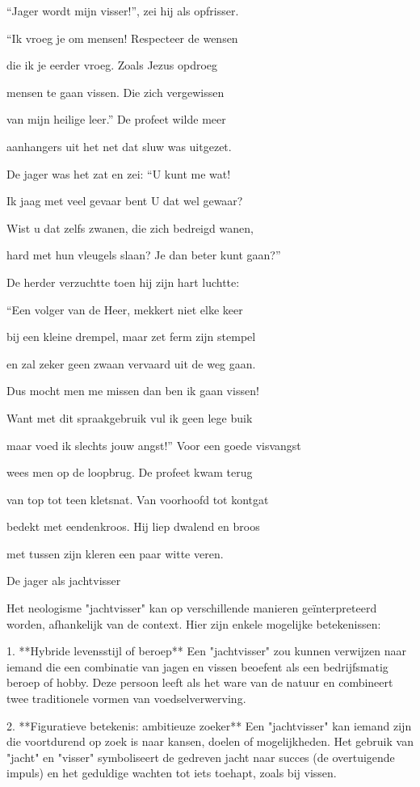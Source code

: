 “Jager wordt mijn visser!”,
zei hij als opfrisser.

“Ik vroeg je om mensen!
Respecteer de wensen

die ik je eerder vroeg.
Zoals Jezus opdroeg

mensen te gaan vissen.
Die zich vergewissen

van mijn heilige leer.”
De profeet wilde meer

aanhangers uit het net
dat sluw was uitgezet.

De jager was het zat
en zei: “U kunt me wat!

Ik jaag met veel gevaar
bent U dat wel gewaar?

Wist u dat zelfs zwanen,
die zich bedreigd wanen,

hard met hun vleugels slaan?
Je dan beter kunt gaan?”

De herder verzuchtte
toen hij zijn hart luchtte:

“Een volger van de Heer,
mekkert niet elke keer

bij een kleine drempel,
maar zet ferm zijn stempel

en zal zeker geen zwaan
vervaard uit de weg gaan.

Dus mocht men me missen
dan ben ik gaan vissen!

Want met dit spraakgebruik
vul ik geen lege buik

maar voed ik slechts jouw angst!”
Voor een goede visvangst

wees men op de loopbrug.
De profeet kwam terug

van top tot teen kletsnat.
Van voorhoofd tot kontgat

bedekt met eendenkroos.
Hij liep dwalend en broos

met tussen zijn kleren
een paar witte veren.

De jager als jachtvisser

Het neologisme "jachtvisser" kan op verschillende manieren geïnterpreteerd worden, afhankelijk van de context. Hier zijn enkele mogelijke betekenissen:

1. **Hybride levensstijl of beroep**
Een "jachtvisser" zou kunnen verwijzen naar iemand die een combinatie van jagen en vissen beoefent als een bedrijfsmatig beroep of hobby. Deze persoon leeft als het ware van de natuur en combineert twee traditionele vormen van voedselverwerving.

2. **Figuratieve betekenis: ambitieuze zoeker**
Een "jachtvisser" kan iemand zijn die voortdurend op zoek is naar kansen, doelen of mogelijkheden. Het gebruik van "jacht" en "visser" symboliseert de gedreven jacht naar succes (de overtuigende impuls) en het geduldige wachten tot iets toehapt, zoals bij vissen.

